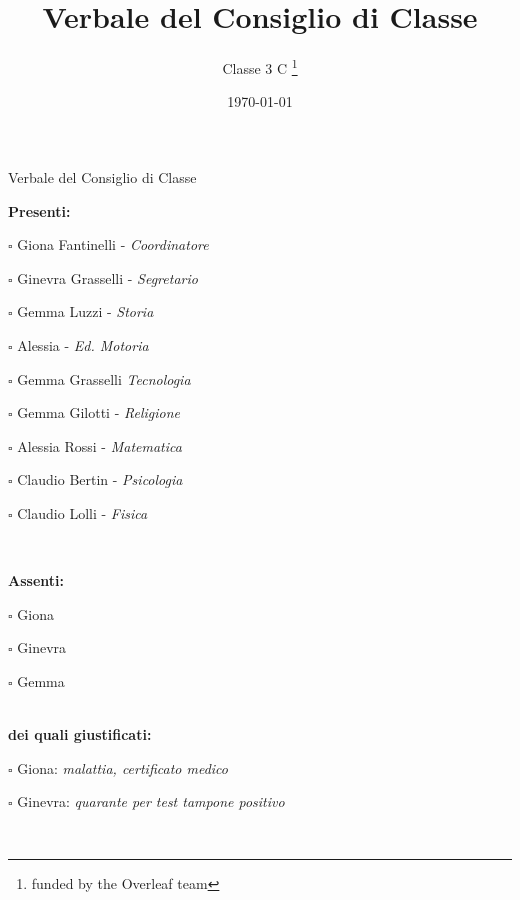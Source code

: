 \documentclass[11pt]{article}
\title{Verbale del Consiglio di Classe}
\author{Classe 3 C \thanks{funded by the Overleaf team}}
\date{\today}
\begin{document}
\begin{center}
	{\huge Verbale del Consiglio di Classe}\\[40pt]
\end{center}
{\bf Presenti:}
\begin{multicols}{2}
\noindent
\begin{itemize*}
 \item [$\square$]Giona Fantinelli - \em Coordinatore\\
  \item [$\square$]Ginevra Grasselli - \em Segretario\\
  \item [$\square$]Gemma Luzzi - \em Storia\\
  \item [$\square$]Alessia - \em Ed. Motoria\\
  \item [$\square$]Gemma Grasselli \em Tecnologia\\
  \item [$\square$]Gemma Gilotti - \em Religione\\
  \item [$\square$]Alessia Rossi - \em Matematica\\
  \item [$\square$]Claudio Bertin - \em Psicologia\\
  \item [$\square$]Claudio Lolli - \em Fisica\\
\end{itemize*}\\[16pt]
\end{multicols}
{\bf Assenti:}\\[6pt]
\begin{itemize*}
  \item [$\square$]Giona
  \item [$\square$]Ginevra
  \item [$\square$]Gemma
\end{itemize*}\\[12pt]
{\bf dei quali giustificati:}\\[6pt]
\begin{itemize*}
  \item [$\square$]Giona: {\em malattia, certificato medico}\\
  \item [$\square$]Ginevra: {\em quarante per test tampone positivo}\\
\end{itemize*}\\
\end{document}
